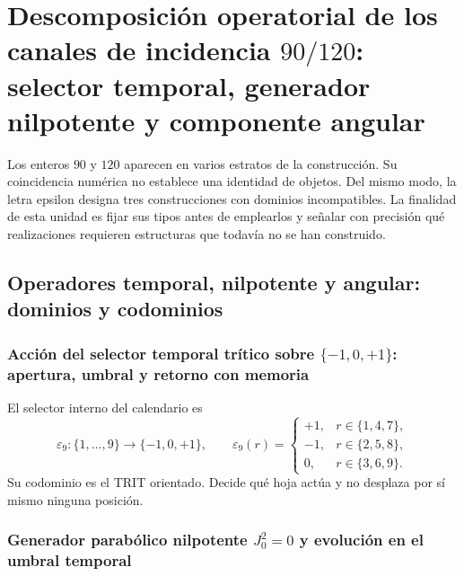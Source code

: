 {%

\section{Descomposición operatorial de los canales de incidencia \texorpdfstring{\(90/120\)}{90/120}: selector temporal, generador nilpotente y componente angular}
\label{p12-83-c1-s7:chap:canales-90-120-epsilon}

Los enteros \(90\) y \(120\) aparecen en varios estratos de la construcción. Su
coincidencia numérica no establece una identidad de objetos. Del mismo modo,
la letra epsilon designa tres construcciones con dominios incompatibles. La
finalidad de esta unidad es fijar sus tipos antes de emplearlos y señalar
con precisión qué realizaciones requieren estructuras que todavía no se han
construido.

\subsection{Operadores temporal, nilpotente y angular: dominios y codominios}

\subsubsection{Acción del selector temporal trítico sobre \(\{-1,0,+1\}\): apertura, umbral y retorno con memoria}

El selector interno del calendario es
\begin{equation}
 \varepsilon_9:\{1,\ldots,9\}
 \longrightarrow\{-1,0,+1\},
 \qquad
 \varepsilon_9(r)=
 \begin{cases}
  +1,&r\in\{1,4,7\},\\
  -1,&r\in\{2,5,8\},\\
  0,&r\in\{3,6,9\}.
 \end{cases}
 \label{p12-83-c1-s7:eq:u006e-epsilon-temporal}
\end{equation}
Su codominio es el TRIT orientado. Decide qué hoja actúa y no desplaza por
sí mismo ninguna posición.

\subsubsection{Generador parabólico nilpotente \(J_0^2=0\) y evolución en el umbral temporal}

}
